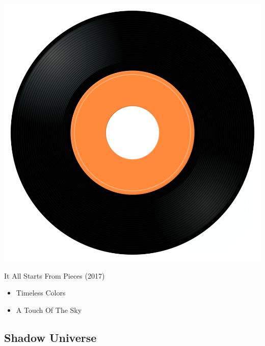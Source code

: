 \begin{minipage}[t]{0.25\textwidth}
\captionsetup{type=figure}
\includegraphics[width=\textwidth]{Images/cover.png}
\caption*{It All Starts From Pieces (2017)}
\end{minipage}
\begin{minipage}[t]{0.25\textwidth}\vspace{0pt}
\begin{itemize}[nosep,leftmargin=1em,labelwidth=*,align=left]
	\setlength{\itemsep}{0pt}
	\item Timeless Colors
	\item A Touch Of The Sky
\end{itemize}
\end{minipage}

\subsection{Shadow Universe}

